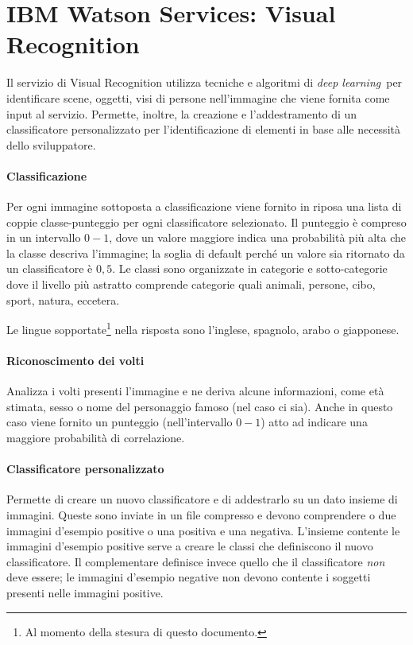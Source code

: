 \section{IBM Watson Services: Visual Recognition}
Il servizio di Visual Recognition\cite{ibm-api} utilizza tecniche e algoritmi di \textit{deep learning} per identificare scene, oggetti, visi di persone nell'immagine che viene fornita come input al servizio. Permette, inoltre, la creazione e l'addestramento di un classificatore personalizzato per l'identificazione di elementi in base alle necessità dello sviluppatore.

\paragraph{Classificazione} Per ogni immagine sottoposta a classificazione viene fornito in riposa una lista di coppie classe-punteggio per ogni classificatore selezionato. Il punteggio è compreso in un intervallo $0-1$, dove un valore maggiore indica una probabilità più alta che la classe descriva l'immagine; la soglia di default perché un valore sia ritornato da un classificatore è $0,5$.
Le classi sono organizzate in categorie e sotto-categorie dove il livello più astratto comprende categorie quali animali, persone, cibo, sport, natura, eccetera.

Le lingue sopportate\footnote{Al momento della stesura di questo documento.} nella risposta sono l'inglese, spagnolo, arabo o giapponese. 

\paragraph{Riconoscimento dei volti} Analizza i volti presenti l'immagine e ne deriva alcune informazioni, come età stimata, sesso o nome del personaggio famoso (nel caso ci sia). Anche in questo caso viene fornito un punteggio (nell'intervallo $0-1$) atto ad indicare una maggiore probabilità di correlazione.

\paragraph{Classificatore personalizzato} Permette di creare un nuovo classificatore e di addestrarlo su un dato insieme di immagini. Queste sono inviate in un file compresso e devono comprendere o due immagini d'esempio positive o una positiva e una negativa. L'insieme contente le immagini d'esempio positive serve a creare le classi che definiscono il nuovo classificatore. Il complementare definisce invece quello che il classificatore \textit{non} deve essere; le immagini d'esempio negative non devono contente i soggetti presenti nelle immagini positive.

